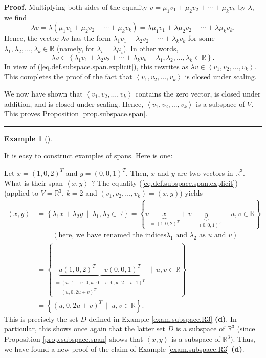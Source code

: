 \documentclass[numbers=enddot,12pt,final,onecolumn,notitlepage]{scrartcl}%
\theoremstyle{definition}
\newtheorem{exam}[theo]{Example}
\newenvironment{example}[1][]
{\begin{exam}[#1]\begin{leftbar}}
{\end{leftbar}\end{exam}}
\newenvironment{proof}[1][Proof]{\noindent\textbf{#1.} }{\ \rule{0.5em}{0.5em}}
\begin{document}
\begin{proof}
Multiplying both sides of the equality $v=\mu_{1}v_{1}+\mu_{2}v_{2}+\cdots
+\mu_{k}v_{k}$ by $\lambda$, we find%
\[
\lambda v=\lambda\left(  \mu_{1}v_{1}+\mu_{2}v_{2}+\cdots+\mu_{k}v_{k}\right)
=\lambda\mu_{1}v_{1}+\lambda\mu_{2}v_{2}+\cdots+\lambda\mu_{k}v_{k}.
\]
Hence, the vector $\lambda v$ has the form $\lambda_{1}v_{1}+\lambda_{2}%
v_{2}+\cdots+\lambda_{k}v_{k}$ for some $\lambda_{1},\lambda_{2}%
,\ldots,\lambda_{k}\in\mathbb{R}$ (namely, for $\lambda_{i}=\lambda\mu_{i}$).
In other words,
\[
\lambda v\in\left\{  \lambda_{1}v_{1}+\lambda_{2}v_{2}+\cdots+\lambda_{k}%
v_{k}\ \mid\ \lambda_{1},\lambda_{2},\ldots,\lambda_{k}\in\mathbb{R}\right\}
.
\]
In view of (\ref{eq.def.subspace.span.explicit}), this rewrites as $\lambda
v\in\left\langle v_{1},v_{2},\ldots,v_{k}\right\rangle $. This completes the
proof of the fact that $\left\langle v_{1},v_{2},\ldots,v_{k}\right\rangle $
is closed under scaling.

We now have shown that $\left\langle v_{1},v_{2},\ldots,v_{k}\right\rangle $
contains the zero vector, is closed under addition, and is closed under
scaling. Hence, $\left\langle v_{1},v_{2},\ldots,v_{k}\right\rangle $ is a
subspace of $V$. This proves Proposition \ref{prop.subspace.span}.
\end{proof}

\begin{example}
It is easy to construct examples of spans. Here is one:

Let $x=\left(  1,0,2\right)  ^{T}$ and $y=\left(  0,0,1\right)  ^{T}$. Then,
$x$ and $y$ are two vectors in $\mathbb{R}^{3}$. What is their span
$\left\langle x,y\right\rangle $ ? The equality
(\ref{eq.def.subspace.span.explicit}) (applied to $V=\mathbb{R}^{3}$, $k=2$
and $\left(  v_{1},v_{2},\ldots,v_{k}\right)  =\left(  x,y\right)  $) yields%
\begin{align*}
\left\langle x,y\right\rangle  &  =\left\{  \lambda_{1}x+\lambda_{2}%
y\ \mid\ \lambda_{1},\lambda_{2}\in\mathbb{R}\right\}  =\left\{
u\underbrace{x}_{=\left(  1,0,2\right)  ^{T}}+v\underbrace{y}_{=\left(
0,0,1\right)  ^{T}}\ \mid\ u,v\in\mathbb{R}\right\} \\
&  \ \ \ \ \ \ \ \ \ \ \left(  \text{here, we have renamed the indices
}\lambda_{1}\text{ and }\lambda_{2}\text{ as }u\text{ and }v\right) \\
&  =\left\{  \underbrace{u\left(  1,0,2\right)  ^{T}+v\left(  0,0,1\right)
^{T}}_{\substack{=\left(  u\cdot1+v\cdot0,u\cdot0+v\cdot0,u\cdot
2+v\cdot1\right)  ^{T}\\=\left(  u,0,2u+v\right)  ^{T}}}\ \mid\ u,v\in
\mathbb{R}\right\} \\
&  =\left\{  \left(  u,0,2u+v\right)  ^{T}\ \mid\ u,v\in\mathbb{R}\right\}  .
\end{align*}
This is precisely the set $D$ defined in Example \ref{exam.subspace.R3}
\textbf{(d)}. In particular, this shows once again that the latter set $D$ is
a subspace of $\mathbb{R}^{3}$ (since Proposition \ref{prop.subspace.span}
shows that $\left\langle x,y\right\rangle $ is a subspace of $\mathbb{R}^{3}%
$). Thus, we have found a new proof of the claim of Example
\ref{exam.subspace.R3} \textbf{(d)}.
\end{example}
\end{document}
